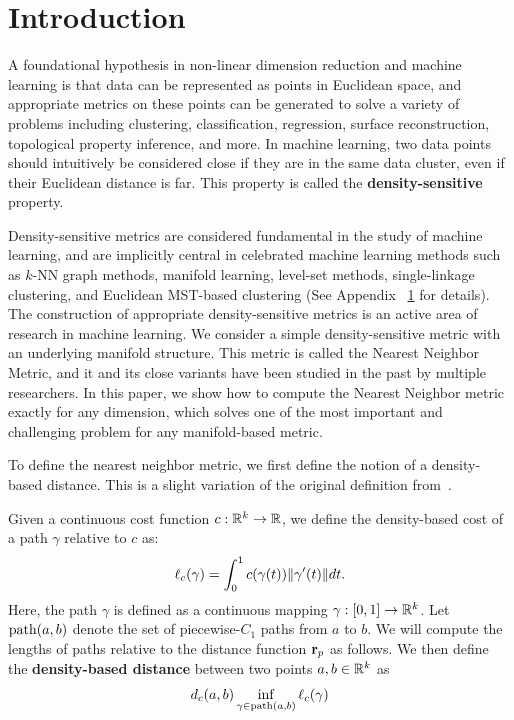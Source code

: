 \section{Introduction} A foundational hypothesis in non-linear dimension
reduction and machine learning is that data can be represented as points in
Euclidean space, and appropriate metrics on these points can be generated
to solve a variety of problems including clustering, classification,
regression, surface reconstruction, topological property inference, and
more. In machine learning, two data points should intuitively be considered
close if they are in the same data cluster, even if their Euclidean
distance is far. This property is called the \textbf{density-sensitive}
property.

Density-sensitive metrics are considered fundamental in the study of
machine learning, and are implicitly central in celebrated machine learning
methods such as $k$-NN graph methods, manifold learning, level-set methods,
single-linkage clustering, and Euclidean MST-based clustering (See Appendix
~\ref{} for details). The construction of appropriate density-sensitive
metrics is an active area of research in machine learning. We consider a
simple density-sensitive metric with an underlying manifold structure.
This metric is called the Nearest Neighbor Metric, and it and its close
variants have been studied in the past by multiple researchers. 
In this paper, we show how to
compute the Nearest Neighbor metric exactly for any dimension, which solves
one of the most important and challenging problem for any manifold-based
metric.

To define the nearest neighbor metric, we first define the notion of a
density-based distance. This is a slight variation of the original
definition from~\cite{}.

\begin{definition}
Given a continuous cost function $c:\mathbb{R}^k \rightarrow \mathbb{R}$, we define the density-based
cost of a path $\gamma$ relative to $c$ as: 
\[ \ell_c(\gamma) = \int_{0}^1 c(\gamma(t)) \| \gamma'(t) \|dt. \]
Here, the path $\gamma$ is defined as a continuous mapping $\gamma:[0,1]
\to \mathbb{R}^k$.
Let $\mathrm{path}(a,b)$ denote the set
of piecewise-$C_1$ paths from $a$ to $b$.  We will compute the
lengths of paths relative to the distance function $\mathbf{r}_p$ as
follows. 
We then define the \textbf{density-based distance} between two points $a, b \in
\mathbb{R}^k$ as 
\[ d_c(a,b) \inf_{\gamma\in\mathrm{path}(a,b)} \ell_c(\gamma)\]
\end{definition}

